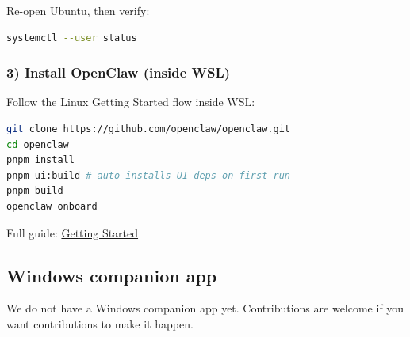 Re-open Ubuntu, then verify:

\begin{lstlisting}[language=bash]
systemctl --user status
\end{lstlisting}


\subsubsection{3) Install OpenClaw (inside WSL)}


Follow the Linux Getting Started flow inside WSL:

\begin{lstlisting}[language=bash]
git clone https://github.com/openclaw/openclaw.git
cd openclaw
pnpm install
pnpm ui:build # auto-installs UI deps on first run
pnpm build
openclaw onboard
\end{lstlisting}


Full guide: \href{/start/getting-started}{Getting Started}

\subsection{Windows companion app}


We do not have a Windows companion app yet. Contributions are welcome if you want
contributions to make it happen.


\clearpage
